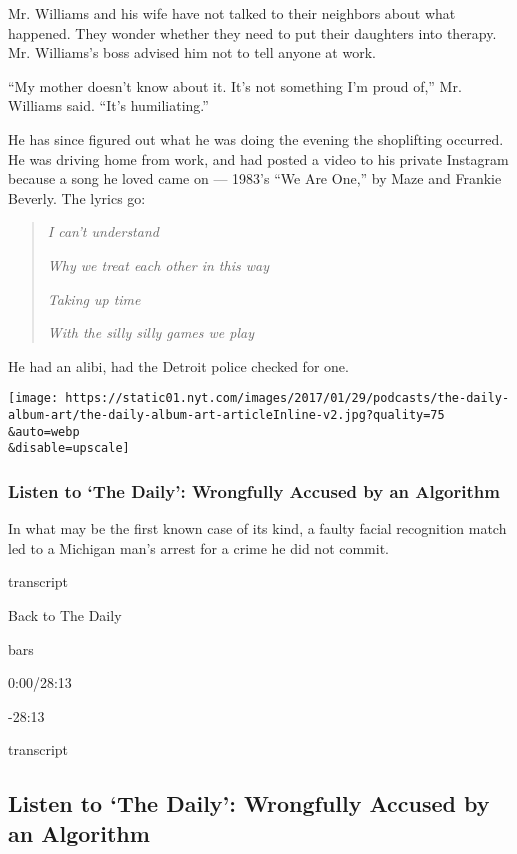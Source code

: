 Mr. Williams and his wife have not talked to their neighbors about what
happened. They wonder whether they need to put their daughters into
therapy. Mr. Williams's boss advised him not to tell anyone at work.

``My mother doesn't know about it. It's not something I'm proud of,''
Mr. Williams said. ``It's humiliating.''

He has since figured out what he was doing the evening the shoplifting
occurred. He was driving home from work, and had posted a video to his
private Instagram because a song he loved came on --- 1983's ``We Are
One,'' by Maze and Frankie Beverly. The lyrics go:

\begin{quote}
\emph{I can't understand}

\emph{Why we treat each other in this way}

\emph{Taking up time}

\emph{With the silly silly games we play}
\end{quote}

He had an alibi, had the Detroit police checked for one.

\texttt{[image: https://static01.nyt.com/images/2017/01/29/podcasts/the-daily-album-art/the-daily-album-art-articleInline-v2.jpg?quality=75\\\&auto=webp\\\&disable=upscale]}

\hypertarget{listen-to-the-daily-wrongfully-accused-by-an-algorithm}{%
\subsubsection{Listen to `The Daily': Wrongfully Accused by an
Algorithm}\label{listen-to-the-daily-wrongfully-accused-by-an-algorithm}}

In what may be the first known case of its kind, a faulty facial
recognition match led to a Michigan man's arrest for a crime he did not
commit.

transcript

Back to The Daily

bars

0:00/28:13

-28:13

transcript

\hypertarget{listen-to-the-daily-wrongfully-accused-by-an-algorithm-1}{%
\subsection{Listen to `The Daily': Wrongfully Accused by an
Algorithm}\label{listen-to-the-daily-wrongfully-accused-by-an-algorithm-1}}

